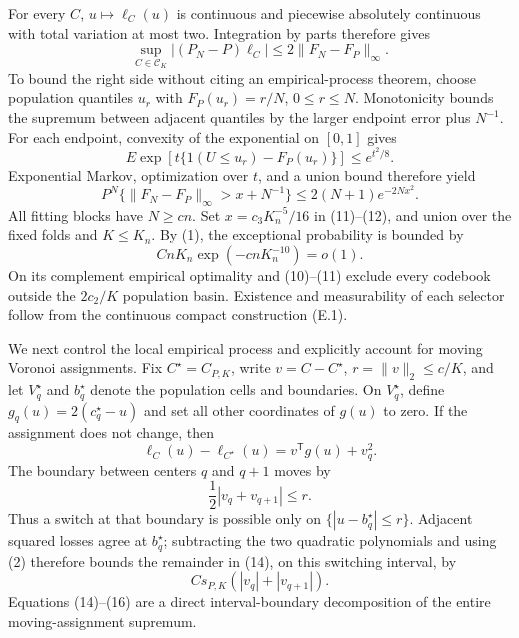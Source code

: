 For every \(C\), \(u\mapsto\ell_C(u)\) is continuous and piecewise absolutely continuous with total variation at most two.  Integration by parts therefore gives
\[
 \sup_{C\in\mathcal C_K}|(P_N-P)\ell_C|\leq2\|F_N-F_P\|_\infty.                \tag{11}
\]
To bound the right side without citing an empirical-process theorem, choose population quantiles \(u_r\) with \(F_P(u_r)=r/N\), \(0\leq r\leq N\).  Monotonicity bounds the supremum between adjacent quantiles by the larger endpoint error plus \(N^{-1}\).  For each endpoint, convexity of the exponential on \([0,1]\) gives
\[
 E\exp[t\{1(U\leq u_r)-F_P(u_r)\}]\leq e^{t^2/8}.
\]
Exponential Markov, optimization over \(t\), and a union bound therefore yield
\[
 P^N\{\|F_N-F_P\|_\infty>x+N^{-1}\}\leq2(N+1)e^{-2Nx^2}.                     \tag{12}
\]
All fitting blocks have \(N\geq cn\).  Set \(x=c_3K_n^{-5}/16\) in (11)--(12), and union over the fixed folds and \(K\leq K_n\).  By (1), the exceptional probability is bounded by
\[
 CnK_n\exp(-cnK_n^{-10})=o(1).                                                \tag{13}
\]
On its complement empirical optimality and (10)--(11) exclude every codebook outside the \(2c_2/K\) population basin.  Existence and measurability of each selector follow from the continuous compact construction (E.1).

We next control the local empirical process and explicitly account for moving Voronoi assignments.  Fix \(C^\star=C_{P,K}\), write \(v=C-C^\star\), \(r=\|v\|_2\leq c/K\), and let \(V_q^\star\) and \(b_q^\star\) denote the population cells and boundaries.  On \(V_q^\star\), define \(g_q(u)=2(c_q^\star-u)\) and set all other coordinates of \(g(u)\) to zero.  If the assignment does not change, then
\[
 \ell_C(u)-\ell_{C^\star}(u)=v^{\mathsf T}g(u)+v_q^2.                         \tag{14}
\]
The boundary between centers \(q\) and \(q+1\) moves by
\[
 \frac12|v_q+v_{q+1}|\leq r.                                                   \tag{15}
\]
Thus a switch at that boundary is possible only on
\(\{|u-b_q^\star|\leq r\}\).  Adjacent squared losses agree at \(b_q^\star\); subtracting the two quadratic polynomials and using (2) therefore bounds the remainder in (14), on this switching interval, by
\[
 Cs_{P,K}(|v_q|+|v_{q+1}|).                                                    \tag{16}
\]
Equations (14)--(16) are a direct interval-boundary decomposition of the entire moving-assignment supremum.

